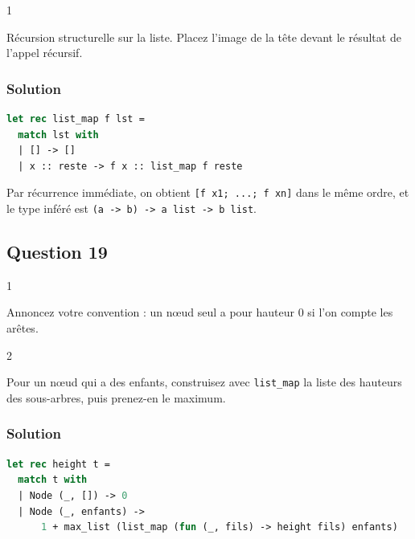 \documentclass[11pt,a4paper]{article}
\begin{document}
\begin{indication}{1}

Récursion structurelle sur la liste. Placez l'image de la tête devant le résultat de l'appel récursif.

\end{indication}

\hypertarget{solution-17}{%
\subsubsection{Solution}\label{solution-17}}

\begin{lstlisting}[language=Caml]
let rec list_map f lst =
  match lst with
  | [] -> []
  | x :: reste -> f x :: list_map f reste
\end{lstlisting}

Par récurrence immédiate, on obtient \texttt{{[}f\ x1;\allowbreak{}\ ...;\allowbreak{}\ f\ xn{]}\allowbreak{}} dans le même ordre, et le type inféré est \texttt{(\allowbreak{}\textquotesingle{}a\ -\textgreater{}\ \textquotesingle{}b)\allowbreak{}\ -\textgreater{}\ \textquotesingle{}a\ list\ -\textgreater{}\ \textquotesingle{}b\ list}.

\hypertarget{question-19}{%
\subsection{Question 19}\label{question-19}}

\begin{indication}{1}

Annoncez votre convention : un nœud seul a pour hauteur 0 si l'on compte les arêtes.

\end{indication}

\begin{indication}{2}

Pour un nœud qui a des enfants, construisez avec \texttt{list\_map} la liste des hauteurs des sous-arbres, puis prenez-en le maximum.

\end{indication}

\hypertarget{solution-18}{%
\subsubsection{Solution}\label{solution-18}}

\begin{lstlisting}[language=Caml]
let rec height t =
  match t with
  | Node (_, []) -> 0
  | Node (_, enfants) ->
      1 + max_list (list_map (fun (_, fils) -> height fils) enfants)
\end{lstlisting}
\end{document}

